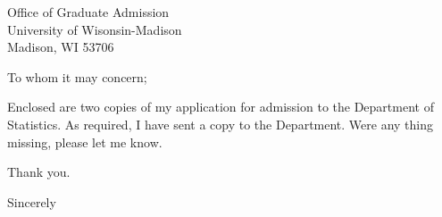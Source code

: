 \documentclass[11pt, a4paper]{letter}
\begin{document}
\address{Cheol Soo Lee\\
9-15 Sinlim Dong\\
Kwan Ak Gu\\
Seoul, Korea}

\begin{letter}
{Office of Graduate Admission\\
University of Wisonsin-Madison\\
Madison, WI 53706}

\opening{To whom it may concern;}
Enclosed are two copies of my application for admission to the Department of Statistics. As required, I have sent a copy to the Department. Were any thing missing, please let me know.

Thank you.
\closing{Sincerely}
\end{letter}
\end{document}
